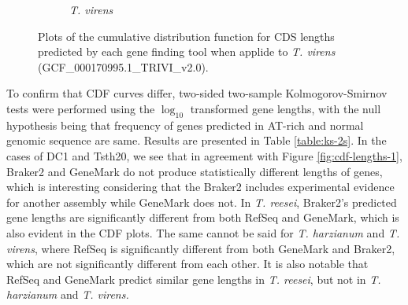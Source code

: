 \begin{figure}
  \centering
  \begin{subfigure}{\textwidth}
    \label{fig:tvirens-lengths}
    \caption{\textit{T. virens}}
  \end{subfigure}
  \caption[CDF plots part 3.]{Plots of the cumulative distribution
    function for CDS lengths predicted by each gene finding tool when
    applide to \textit{T. virens} (GCF\_000170995.1\_TRIVI\_v2.0).}
  \label{fig:cdf-lengths-3}
\end{figure}

To confirm that CDF curves differ, two-sided two-sample
Kolmogorov-Smirnov\cite{ref1} tests were performed using the
$\log_{10}$ transformed gene lengths, with the null hypothesis being
that frequency of genes predicted in AT-rich and normal genomic
sequence are same. Results are presented in Table
\ref{table:ks-2s}. In the cases of DC1 and Tsth20, we see that in
agreement with Figure \ref{fig:cdf-lengths-1}, Braker2 and GeneMark do
not produce statistically different lengths of genes, which is
interesting considering that the Braker2 includes experimental
evidence for another assembly while GeneMark does not. In
\textit{T. reesei}, Braker2's predicted gene lengths are significantly
different from both RefSeq and GeneMark, which is also evident in the
CDF plots. The same cannot be said for \textit{T. harzianum} and
\textit{T. virens}, where RefSeq is significantly different from both
GeneMark and Braker2, which are not significantly different from each
other. It is also notable that RefSeq and GeneMark predict similar
gene lengths in \textit{T. reesei}, but not in \textit{T. harzianum}
and \textit{T. virens.}

